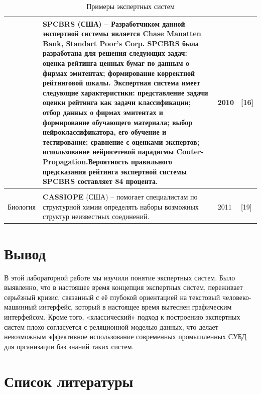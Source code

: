 \documentclass[14pt,a4paper,report]{report}
\begin{document}
\begin{table}[h!]
\begin{tabular}{ | P{2cm} | P{13cm} | P{1cm} | P{0.5cm} | }
& \textbf{SPCBRS } (США) -- Разработчиком данной экспертной системы является Chase Manatten Bank, Standart Poor's Corp. SPCBRS была разработана для решения следующих задач: оценка рейтинга ценных бумаг по данным о фирмах эмитентах; формирование корректной рейтинговой шкалы. Экспертная система имеет следующие характеристики: представление задачи оценки рейтинга как задачи классификации; отбор данных о фирмах эмитентах и формирование обучающего материала; выбор нейроклассификатора, его обучение и тестирование; сравнение с оценками экспертов; использование нейросетевой парадигмы Couter-Propagation.Вероятность правильного предсказания рейтинга экспертной системы SPCBRS составляет 84 процента. & 2010 & [16] \\ \hline
\\ \hline


Биология 


& \textbf{CASSIOPE} (США) -- помогает специалистам по структурной химии определять наборы возможных структур неизвестных соединений. & 2011 & [19] \\ \hline


\end{tabular}
\egroup
\caption{Примеры экспертных систем}
\label{table:2}
\end{table}

\section{Вывод}

В этой лабораторной работе мы изучили понятие экспертных систем. Было выявленно, что в настоящее время концепция экспертных систем, переживает серьёзный кризис, связанный с её глубокой ориентацией на текстовый человеко-машинный интерфейс, который в настоящее время вытеснен графическим интерфейсом. Кроме того, «классический» подход к построению экспертных систем плохо согласуется с реляционной моделью данных, что делает невозможным эффективное использование современных промышленных СУБД для организации баз знаний таких систем.

\clearpage

\section{Список литературы}
\end{document}
